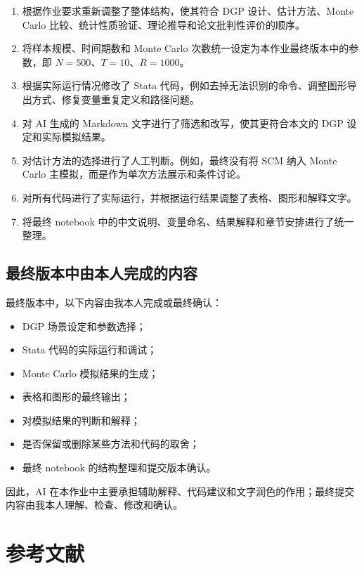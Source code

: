 \documentclass[
  fontset=windows]{ctexart}
\providecommand{\tightlist}{%
  \setlength{\itemsep}{0pt}\setlength{\parskip}{0pt}}
\begin{document}
\begin{enumerate}
\def\labelenumi{\arabic{enumi}.}
\tightlist
\item
  根据作业要求重新调整了整体结构，使其符合 DGP 设计、估计方法、Monte
  Carlo 比较、统计性质验证、理论推导和论文批判性评价的顺序。
\item
  将样本规模、时间期数和 Monte Carlo
  次数统一设定为本作业最终版本中的参数，即
  \(N=500\)、\(T=10\)、\(R=1000\)。
\item
  根据实际运行情况修改了 Stata
  代码，例如去掉无法识别的命令、调整图形导出方式、修复变量重复定义和路径问题。
\item
  对 AI 生成的 Markdown 文字进行了筛选和改写，使其更符合本文的 DGP
  设定和实际模拟结果。
\item
  对估计方法的选择进行了人工判断。例如，最终没有将 SCM 纳入 Monte Carlo
  主模拟，而是作为单次方法展示和条件讨论。
\item
  对所有代码进行了实际运行，并根据运行结果调整了表格、图形和解释文字。
\item
  将最终 notebook
  中的中文说明、变量命名、结果解释和章节安排进行了统一整理。
\end{enumerate}

\subsection{最终版本中由本人完成的内容}\label{ux6700ux7ec8ux7248ux672cux4e2dux7531ux672cux4ebaux5b8cux6210ux7684ux5185ux5bb9}

最终版本中，以下内容由我本人完成或最终确认：

\begin{itemize}
\tightlist
\item
  DGP 场景设定和参数选择；
\item
  Stata 代码的实际运行和调试；
\item
  Monte Carlo 模拟结果的生成；
\item
  表格和图形的最终输出；
\item
  对模拟结果的判断和解释；
\item
  是否保留或删除某些方法和代码的取舍；
\item
  最终 notebook 的结构整理和提交版本确认。
\end{itemize}

因此，AI
在本作业中主要承担辅助解释、代码建议和文字润色的作用；最终提交内容由我本人理解、检查、修改和确认。

\section{参考文献}\label{ux53c2ux8003ux6587ux732e}
\end{document}
